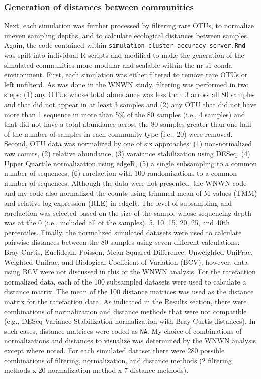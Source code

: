 \documentclass[
]{article}
\begin{document}
\hypertarget{generation-of-distances-between-communities}{%
\subsubsection{Generation of distances between
communities}\label{generation-of-distances-between-communities}}

Next, each simulation was further processed by filtering rare OTUs, to
normalize uneven sampling depths, and to calculate ecological distances
between samples. Again, the code contained within
\texttt{simulation-cluster-accuracy-server.Rmd} was spilt into
individual R scripts and modified to make the generation of the
simulated communities more modular and scalable within the nr-s1 conda
environment. First, each simulation was either filtered to remove rare
OTUs or left unfilterd. As was done in the WNWN study, filtering was
performed in two steps: (1) any OTUs whose total abundance was less than
3 across all 80 samples and that did not appear in at least 3 samples
and (2) any OTU that did not have more than 1 sequence in more than 5\%
of the 80 samples (i.e., 4 samples) and that did not have a total
abundance across the 80 samples greater than one half of the number of
samples in each community type (i.e., 20) were removed. Second, OTU data
was normalized by one of six approaches: (1) non-normalized raw counts,
(2) relative abundance, (3) varaiance stabilization using DESeq, (4)
Upper Quartile normalization using edgeR, (5) a single subsampling to a
common number of sequences, (6) rarefaction with 100 randomizations to a
common number of sequences. Although the data were not presented, the
WNWN code and my code also normalized the counts using trimmed mean of
M-values (TMM) and relative log expression (RLE) in edgeR. The level of
subsampling and rarefaction was selected based on the size of the sample
whose sequencing depth was at the 0 (i.e., included all of the samples),
5, 10, 15, 20, 25, and 40th percentiles. Finally, the normalized
simulated datasets were used to calculate pairwise distances between the
80 samples using seven different calculations: Bray-Curtis, Euclidean,
Poisson, Mean Squared Difference, Unweighted UniFrac, Weighted Unifrac,
and Biological Coeffcient of Variation (BCV); however, data using BCV
were not discussed in this or the WNWN analysis. For the rarefaction
normalized data, each of the 100 subsampled datasets were used to
calculate a distance matrix. The mean of the 100 distance matrices was
used as the distance matrix for the rarefaction data. As indicated in
the Results section, there were combinations of normalization and
distance methods that were not compatible (e.g., DESeq Variance
Stabilization normalization with Bray-Curtis distances). In such cases,
distance matrices were coded as \texttt{NA}. My choice of combinations
of normalizations and distances to visualize was determined by the WNWN
analysis except where noted. For each simulated dataset there were 280
possible combinations of filtering, normalization, and distance methods
(2 filtering methods x 20 normalization method x 7 distance methods).
\end{document}
